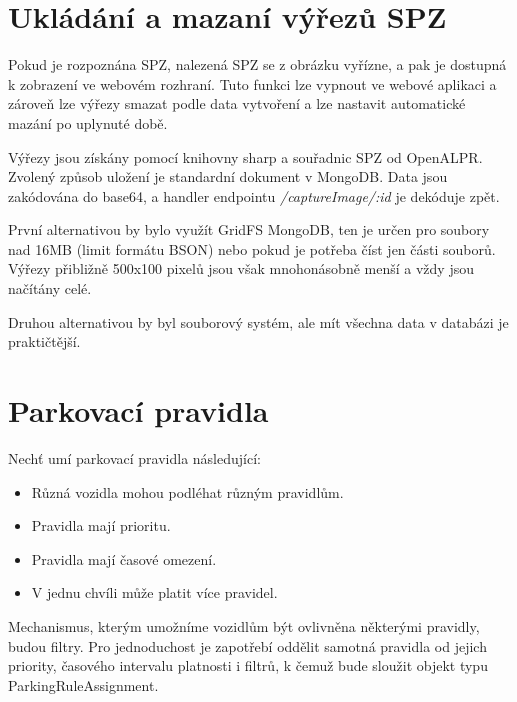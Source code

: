 \section{Ukládání a mazaní výřezů SPZ}

\noindent
Pokud je rozpoznána SPZ, nalezená SPZ se z obrázku vyřízne, a pak je dostupná k zobrazení ve webovém rozhraní.
Tuto funkci lze vypnout ve webové aplikaci a zároveň lze výřezy smazat podle data vytvoření a
lze nastavit automatické mazání po uplynuté době.

Výřezy jsou získány pomocí knihovny sharp a souřadnic SPZ od OpenALPR.
Zvolený způsob uložení je standardní dokument v MongoDB. Data jsou zakódována do base64,
a handler endpointu \textit{/captureImage/:id} je dekóduje zpět.

První alternativou by bylo využít GridFS MongoDB, ten je určen pro soubory
nad 16MB (limit formátu BSON) nebo pokud je potřeba číst jen části souborů.
Výřezy přibližně 500x100 pixelů jsou však mnohonásobně menší a vždy jsou načítány celé.

Druhou alternativou by byl souborový systém, ale mít všechna data v databázi je praktičtější.

\section{Parkovací pravidla} \label{analysis_parking_schema}

\noindent
Nechť umí parkovací pravidla následující:

\begin{itemize}
  \setlength\itemsep{.05em}
  \item Různá vozidla mohou podléhat různým pravidlům.
  \item Pravidla mají prioritu.
  \item Pravidla mají časové omezení.
  \item V jednu chvíli může platit více pravidel.
\end{itemize}

Mechanismus, kterým umožníme vozidlům být ovlivněna některými pravidly,
budou filtry.
Pro jednoduchost je zapotřebí oddělit samotná pravidla od jejich
priority, časového intervalu platnosti i filtrů,
k čemuž bude sloužit objekt typu ParkingRuleAssignment.

